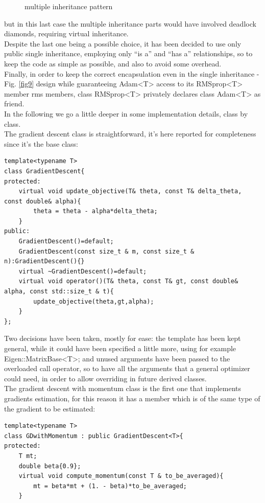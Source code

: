 \documentclass[12pt, a4paper]{report}
\theoremstyle{definition}
\begin{document}
{\begin{figure}[H]
	\caption{multiple inheritance pattern}
\end{figure}
\noindent but in this last case the multiple inheritance parts would have involved deadlock diamonds, requiring virtual inheritance.\\
Despite the last one being a possible choice, it has been decided to use only public single inheritance, employing only ``is a'' and ``has a'' relationships, so to keep the code as simple as possible, and also to avoid some overhead.\\
Finally, in order to keep the correct encapsulation even in the single inheritance - Fig. \ref{fig9} design while guaranteeing {\ttfamily Adam<T>} access to its {\ttfamily RMSprop<T>} member {\ttfamily rms} members, class {\ttfamily RMSprop<T>} privately declares class {\ttfamily Adam<T>} as friend.\\
\newline \noindent In the following we go a little deeper in some implementation details, class by class.\\
The gradient descent class is straightforward, it's here reported for completeness since it's the base class:
\begin{lstlisting}[frame=single]
template<typename T>
class GradientDescent{
protected:
	virtual void update_objective(T& theta, const T& delta_theta, const double& alpha){
		theta = theta - alpha*delta_theta;  
	}
public:
	GradientDescent()=default;
	GradientDescent(const size_t & m, const size_t & n):GradientDescent(){}
	virtual ~GradientDescent()=default;
	virtual void operator()(T& theta, const T& gt, const double& alpha, const std::size_t & t){
		update_objective(theta,gt,alpha);
	}
};
\end{lstlisting}
\noindent Two decisions have been taken, mostly for ease: the template has been kept general, while it could have been specified a little more, using for example {\ttfamily Eigen::MatrixBase<T>}; and unused arguments have been passed to the overloaded call operator, so to have all the arguments that a general optimizer could need, in order to allow overriding in future derived classes.\\
The gradient descent with momentum class is the first one that implements gradients estimation, for this reason it has a member which is of the same type of the gradient to be estimated:
\begin{lstlisting}[frame=single]
template<typename T>
class GDwithMomentum : public GradientDescent<T>{
protected:
	T mt;
	double beta{0.9};
	virtual void compute_momentum(const T & to_be_averaged){
		mt = beta*mt + (1. - beta)*to_be_averaged;
	}


\end{lstlisting}}
\end{document}
